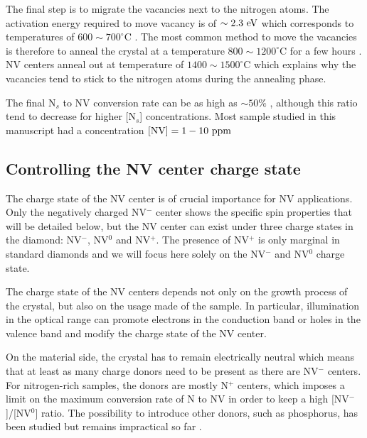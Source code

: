 \documentclass[a4paper,11pt]{report}
\begin{document}
The final step is to migrate the vacancies next to the nitrogen atoms. The activation energy required to move vacancy is of $\sim 2.3\ \rm eV$ which corresponds to temperatures of $600\sim 700 ^\circ$C \citep{davies1992vacancy, newton2002recombination}. The most common method to move the vacancies is therefore to anneal the crystal at a temperature $800 \sim 1200 ^\circ$C for a few hours \citep{botsoa2011optimal}. NV centers anneal out at temperature of $1400 \sim 1500 ^\circ$C \citep{zaitsev2013optical, pinto2012diffusion} which explains why the vacancies tend to stick to the nitrogen atoms during the annealing phase. 

The final N$_s$ to NV conversion rate can be as high as $\sim 50 \%$ \citep{grezes2015storage, hartland2014study}, although this ratio tend to decrease for higher [N$_s$] concentrations. Most sample studied in this manuscript had a concentration $[\rm NV]= 1-10\ \rm ppm$

\subsection{Controlling the NV center charge state}

The charge state of the NV center is of crucial importance for NV applications. Only the negatively charged NV$^-$ center shows the specific spin properties that will be detailed below, but the NV center can exist under three charge states in the diamond: NV$^-$, NV$^0$ and NV$^+$. The presence of NV$^+$ is only marginal in standard diamonds \citep{hauf2014addressing, pfender2017protecting} and we will focus here solely on the NV$^-$ and NV$^0$ charge state.

The charge state of the NV centers depends not only on the growth process of the crystal, but also on the usage made of the sample. In particular, illumination in the optical range can promote electrons in the conduction band or holes in the valence band and modify the charge state of the NV center.

On the material side, the crystal has to remain electrically neutral which means that at least as many charge donors need to be present as there are NV$^-$ centers. For nitrogen-rich samples, the donors are mostly N$^+$ centers, which imposes a limit on the maximum conversion rate of N to NV in order to keep a high [NV$^-$]/[NV$^0$] ratio. The possibility to introduce other donors, such as phosphorus, has been studied \citep{doi2016pure} but remains impractical so far \citep{barry2020sensitivity}.
\end{document}
